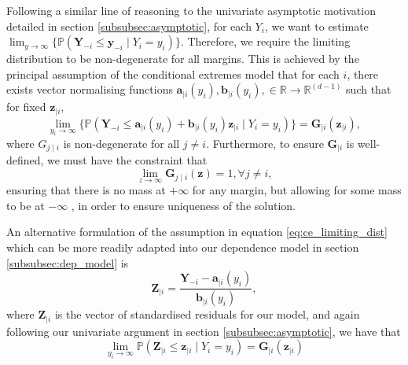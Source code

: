 \documentclass{article}
\numberwithin{equation}{section}
\begin{document}
Following a similar line of reasoning to the univariate asymptotic motivation detailed in section \ref{subsubsec:asymptotic}, for each $Y_i$, we want to estimate $\lim_{y \to \infty}\{\mathbb{P}(\bm{Y}_{-i} \le \bm{y}_{-i} \mid Y_i = y_i)\}$. 
Therefore, we require the limiting distribution to be non-degenerate for all margins.
This is achieved by the principal assumption of the conditional extremes model that for each $i$, there exists vector normalising functions $\bm{a}_{\mid i}(y_i),\bm{b}_{\mid i}(y_i), \in \mathbb{R} \rightarrow \mathbb{R}^{(d-1)}$ such that for fixed $\bm{z}_{\mid i}$,
\begin{equation} \label{eq:ce_limiting_dist}
      \lim_{y_i \rightarrow \infty}\{\mathbb{P}(\bm{Y}_{-i} \le \bm{a}_{\mid i}(y_i) + \bm{b}_{\mid i}(y_i)\bm{z}_{\mid i} \mid Y_i = y_i)\} = \bm{G}_{\mid i}(\bm{z}_{\mid i}),
\end{equation}
where $G_{j \mid i}$ is non-degenerate for all $j \ne i$. 
Furthermore, to ensure $\bm{G}_{\mid i}$ is well-defined, we must have the constraint that 
\[
  \lim_{z \rightarrow \infty}{\bm{G}_{j \mid i}(\bm{z})} = 1, \forall j \ne i,
\]
ensuring that there is no mass at $+\infty$ for any margin, but allowing for some mass to be at $-\infty$ \citep{Keef2013}, in order to ensure uniqueness of the solution.

An alternative formulation of the assumption in equation \eqref{eq:ce_limiting_dist} which can be more readily adapted into our dependence model in section \ref{subsubsec:dep_model} is
\begin{equation} \label{eq:standardised_residuals}
  \bm{Z}_{\mid i} = \frac{\bm{Y}_{-i} - \bm{a}_{\mid i}(y_i)} {\bm{b}_{\mid i}(y_i)},
\end{equation}
where $\bm{Z}_{\mid i}$ is the vector of standardised residuals for our model, and again following our univariate argument in section \ref{subsubsec:asymptotic}, we have that
\[
      \lim_{y_i \rightarrow \infty}\mathbb{P}(\bm{Z}_{\mid i} \le \bm{z}_{\mid i} \mid Y_i = y_i) = \bm{G}_{\mid i}(\bm{z}_{\mid i})
\]
\end{document}
